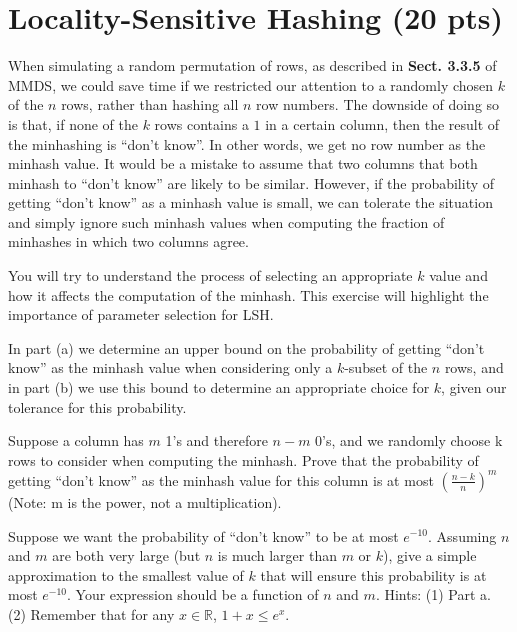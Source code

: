 \section{Locality-Sensitive Hashing (20 pts)}

When simulating a random permutation of rows, as described in \textbf{Sect. 3.3.5} of MMDS, we could save time if we restricted our attention to a randomly chosen $k$ of the $n$ rows, rather than hashing all $n$ row numbers.  The downside of doing so is that, if none of the $k$ rows contains a $1$ in a certain column, then the result of the minhashing is ``don't know''. In other words, we get no row number as the minhash value.  It would be a mistake to assume that two columns that both minhash to ``don't know'' are likely to be similar.  However, if the probability of getting ``don't know'' as a minhash value is small, we can tolerate the situation and simply ignore such minhash values when computing the fraction of minhashes in which two columns agree. 

You will try to understand the process of selecting an appropriate $k$ value and how it affects the computation of the minhash. This exercise will highlight the importance of parameter selection for LSH.

In part (a) we determine an upper bound on the probability of getting ``don't know'' as the minhash value when considering only a $k$-subset of the $n$ rows, and in part (b) we use this bound to determine an appropriate choice for $k$, given our tolerance for this probability.

Suppose a column has $m$ 1's and therefore $n-m$ 0's, and we randomly choose k rows to consider when computing the minhash.  Prove that the probability of getting ``don't know'' as the minhash value for this column is at most $\left(\frac{n-k}{n}\right)^m$ (Note: m is the power, not a multiplication).

\Solution{}

Suppose we want the probability of ``don't know'' to be at most $e^{-10}$.  Assuming $n$ and $m$ are both very large (but $n$ is much larger than $m$ or $k$), give a simple approximation to the smallest value of $k$ that will ensure this probability is at most $e^{-10}$. Your expression should be a function of $n$ and $m$. Hints: (1) Part a. (2) Remember that for any $x \in \mathbb{R}$, $1 + x \le e^x$.

\Solution{}


